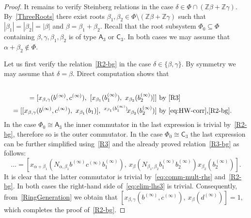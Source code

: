 \documentclass[oneside, 11pt]{amsart}
\numberwithin{equation}{section}
\theoremstyle{definition}
\theoremstyle{remark}
\newcommand{\ZZ}{\mathbb{Z}}
\newcommand{\up}[2]{{^{#1}\!{#2}}}
\newcommand{\rA}{\mathsf{A}}
\newcommand{\rC}{\mathsf{C}}
\begin{document}
\begin{proof}
 It remains to verify Steinberg relations in the case \(\delta \in \Phi \cap (\ZZ \beta + \ZZ \gamma)\).
 By~\cref{ThreeRoots} there exist roots \(\beta_1, \beta_2 \in \Phi \setminus (\ZZ \beta + \ZZ \gamma)\) such that \(|\beta_1| = |\beta_2| = |\beta|\) and \(\beta = \beta_1 + \beta_2\). 
 Recall that the root subsystem $\Phi_0 \subseteq \Phi$ containing $\beta,\gamma,\beta_1,\beta_2$ is of type $\rA_3$ or $\rC_3$. 
 In both cases we may assume that $\alpha + \beta_2 \not\in\Phi$.
 
 Let us first verify the relation~\eqref{R2-bg} in the case $\delta \in \{\beta, \gamma\}$. By symmetry we may assume that $\delta = \beta$. 
 Direct computation shows that
 \begin{align}
  [x_{\beta,\gamma}(b^{(\infty)}, c^{(\infty)}),\ x_\beta(N_{\beta_1, \beta_2} b_1^{(\infty)}b_2^{(\infty)})] \nonumber \\
   = [x_{\beta,\gamma}(b^{(\infty)}, c^{(\infty)}),\ [x_{\beta_1}(b_1^{(\infty)}),\ x_{\beta_2}(b_2^{(\infty)})]]  & \text{ by~\eqref{R3}} \label{eq:elim-lhs3} \\ 
   = [[x_{\beta, \gamma}(b^{(\infty)}, c^{(\infty)}),\ x_{\beta_1}(b_1)],\ \up{x_{\beta_1}(b_1^{(\infty)})} x_{\beta_2}(b_2^{(\infty)})]  & \text{ by~\eqref{eq:HW-corr},\eqref{R2-bg}.} \nonumber \end{align}
In the case $\Phi_0\cong \rA_3$ the inner commutator in the last expression is trivial by~\eqref{R2-bg},
 therefore so is the outer commutator.
In the case $\Phi_0\cong \rC_3$ the last expression can be further simplified using~\eqref{R3} and the already proved relation~\eqref{R3-bg} as follows:
\[ \ldots = [x_{\alpha+\beta_1}(N_{\alpha, \beta_1} b^{(\infty)}c^{(\infty)}b_1^{(\infty)}),\ x_{\beta}(N_{\beta_1, \beta_2} b_1^{(\infty)} b_2^{(\infty)}) x_{\beta_2}(b_2^{(\infty)})]. \]
It is clear that the latter commutator is trivial by~\eqref{eq:comm-mult-rhs} and~\eqref{R2-bg}.  
  In both cases the right-hand side of~\eqref{eq:elim-lhs3} is trivial. Consequently, from~\cref{RingGeneration} we obtain that
 $[x_{\beta,\gamma}(b^{(\infty)}, c^{(\infty)}),\ x_\beta(d^{(\infty)})] = 1,$
 which completes the proof of~\eqref{R2-bg}. 
 

\end{proof}
\end{document}
